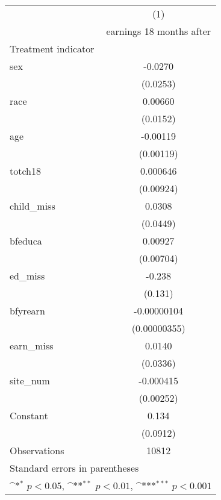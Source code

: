 {
\def\sym#1{\ifmmode^{#1}\else\(^{#1}\)\fi}
\begin{tabular}{l*{1}{c}}
\hline\hline
                    &\multicolumn{1}{c}{(1)}\\
                    &\multicolumn{1}{c}{earnings 18 months after}\\
\hline
Treatment indicator &                     \\
sex                 &     -0.0270         \\
                    &    (0.0253)         \\
[1em]
race                &     0.00660         \\
                    &    (0.0152)         \\
[1em]
age                 &    -0.00119         \\
                    &   (0.00119)         \\
[1em]
totch18             &    0.000646         \\
                    &   (0.00924)         \\
[1em]
child\_miss          &      0.0308         \\
                    &    (0.0449)         \\
[1em]
bfeduca             &     0.00927         \\
                    &   (0.00704)         \\
[1em]
ed\_miss             &      -0.238         \\
                    &     (0.131)         \\
[1em]
bfyrearn            & -0.00000104         \\
                    &(0.00000355)         \\
[1em]
earn\_miss           &      0.0140         \\
                    &    (0.0336)         \\
[1em]
site\_num            &   -0.000415         \\
                    &   (0.00252)         \\
[1em]
Constant            &       0.134         \\
                    &    (0.0912)         \\
\hline
Observations        &       10812         \\
\hline\hline
\multicolumn{2}{l}{\footnotesize Standard errors in parentheses}\\
\multicolumn{2}{l}{\footnotesize \sym{*} \(p<0.05\), \sym{**} \(p<0.01\), \sym{***} \(p<0.001\)}\\
\end{tabular}
}
